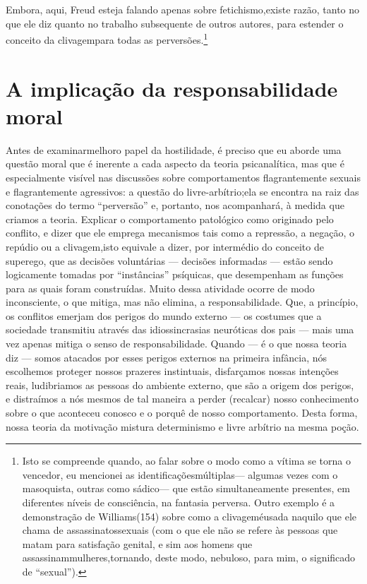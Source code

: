 Embora, aqui, Freud esteja falando apenas sobre fetichismo,\idxfeticfreu[|)] existe
razão, tanto no que ele diz quanto no trabalho subsequente de outros
autores, para estender o conceito da clivagem\idxcliv[|)] para todas as
perversões.\footnote{ Isto se compreende quando, ao falar sobre o modo
como a vítima se torna o vencedor, eu mencionei as identificações\idxmulti[|nn]
múltiplas\idxidentmult[|nn] --- algumas vezes com o masoquista, outras com\idxsadi[|nn] o sádico\idxmasoq[|nn] ---
que estão simultaneamente presentes, em diferentes níveis de
consciência, na fantasia perversa. Outro exemplo é a demonstração de
Williams\idxwill[|nn] (154) sobre como a clivagem\idxconfcliv[|nn] é\idxcliv[|nn] usada naquilo que ele chama de
assassinatos\idxassas[|nn] sexuais (com o que ele não se refere às pessoas que matam
para satisfação genital, e sim aos homens que assassinam\idxfreudfetic[|)] mulheres,\idxfreudaberr[|)]
tornando, deste modo, nebuloso, para mim, o significado de
``sexual'').}




\section{A implicação da responsabilidade moral}

Antes de examinar\idxpervrespo[|(] melhor\idxrespo[|(] o papel da hostilidade, é preciso que eu
aborde uma questão moral que é inerente a cada aspecto da teoria
psicanalítica, mas que é especialmente visível nas discussões sobre
comportamentos flagrantemente sexuais e flagrantemente agressivos: a
questão do livre-arbítrio;\idxlivre[|(] ela se encontra na raiz das conotações do
termo ``perversão'' e, portanto, nos
acompanhará, à medida que criamos a teoria. Explicar o comportamento
patológico como originado pelo conflito, e dizer que ele emprega
mecanismos tais como a repressão, a negação, o repúdio ou a clivagem,\idxconfcliv[|)]
isto equivale a dizer, por intermédio do conceito de superego, que as
decisões voluntárias --- decisões informadas --- estão sendo
logicamente tomadas por ``instâncias''
psíquicas, que desempenham as funções para as quais foram construídas.
Muito dessa atividade ocorre de modo inconsciente, o que mitiga, mas
não elimina, a responsabilidade. Que, a princípio, os conflitos emerjam
dos perigos do mundo externo --- os costumes que a sociedade
transmitiu através das idiossincrasias neuróticas dos pais --- mais
uma vez apenas mitiga o senso de responsabilidade. Quando --- é o que
nossa teoria diz --- somos atacados por esses perigos externos na
primeira infância, nós escolhemos proteger nossos prazeres instintuais,
disfarçamos nossas intenções reais, ludibriamos as pessoas do ambiente
externo, que são a origem dos perigos, e distraímos a nós mesmos de tal
maneira a perder (recalcar) nosso conhecimento sobre o que aconteceu
conosco e o porquê de nosso comportamento. Desta forma, nossa teoria
da motivação mistura determinismo e livre arbítrio na mesma poção.


